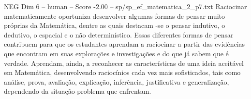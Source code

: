 \begin{textsample}{NEG Dim 6 – human – Score -2.00 – sp/sp\_ef\_matematica\_2\_p7.txt}  \label{ex:f6_neg_013}
Raciocinar matematicamente oportuniza desenvolver algumas formas de pensar muito próprias da Matemática, dentre as quais destacam -se o pensar indutivo, o dedutivo, o espacial e o não determinístico.
Essas diferentes formas de pensar contribuem para que os estudantes aprendam a raciocinar a partir das evidências que encontram em suas explorações e investigações e do que já sabem que é verdade.
Aprendam, ainda, a reconhecer as características de uma ideia aceitável em Matemática, desenvolvendo raciocínios cada vez mais sofisticados, tais como análise, prova, avaliação, explicação, inferência, justificativa e generalização, dependendo da situação-problema que enfrentam.

\end{textsample}
